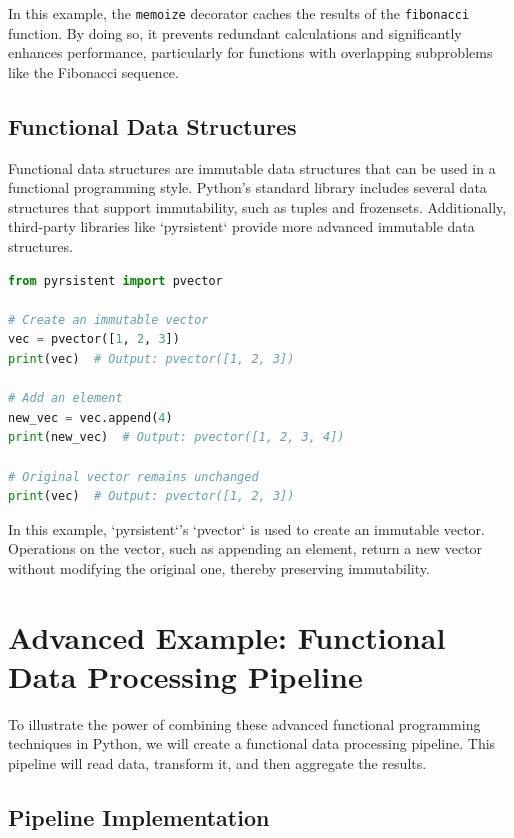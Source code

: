 \documentclass[a4paper]{article}
\begin{document}
In this example, the \texttt{memoize} decorator caches the results of the \texttt{fibonacci} function. By doing so, it prevents redundant calculations and significantly enhances performance, particularly for functions with overlapping subproblems like the Fibonacci sequence.

\subsection{Functional Data Structures}
Functional data structures are immutable data structures that can be used in a functional programming style. Python's standard library includes several data structures that support immutability, such as tuples and frozensets. Additionally, third-party libraries like `pyrsistent` provide more advanced immutable data structures.

\begin{lstlisting}[language=Python, caption=Functional Data Structures Example]
from pyrsistent import pvector

# Create an immutable vector
vec = pvector([1, 2, 3])
print(vec)  # Output: pvector([1, 2, 3])

# Add an element
new_vec = vec.append(4)
print(new_vec)  # Output: pvector([1, 2, 3, 4])

# Original vector remains unchanged
print(vec)  # Output: pvector([1, 2, 3])
\end{lstlisting}

In this example, `pyrsistent`'s `pvector` is used to create an immutable vector. Operations on the vector, such as appending an element, return a new vector without modifying the original one, thereby preserving immutability.

\section{Advanced Example: Functional Data Processing Pipeline}
To illustrate the power of combining these advanced functional programming techniques in Python, we will create a functional data processing pipeline. This pipeline will read data, transform it, and then aggregate the results. 

\subsection{Pipeline Implementation}
\end{document}
